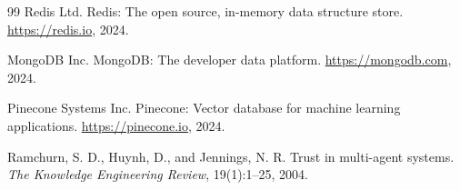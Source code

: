 \documentclass[11pt]{article}
\begin{document}
\begin{thebibliography}{99}
Redis Ltd.
\newblock Redis: The open source, in-memory data structure store.
\newblock \url{https://redis.io}, 2024.

MongoDB Inc.
\newblock MongoDB: The developer data platform.
\newblock \url{https://mongodb.com}, 2024.

Pinecone Systems Inc.
\newblock Pinecone: Vector database for machine learning applications.
\newblock \url{https://pinecone.io}, 2024.

Ramchurn, S. D., Huynh, D., and Jennings, N. R.
\newblock Trust in multi-agent systems.
\newblock \emph{The Knowledge Engineering Review}, 19(1):1--25, 2004.

\end{thebibliography}
\end{document}
